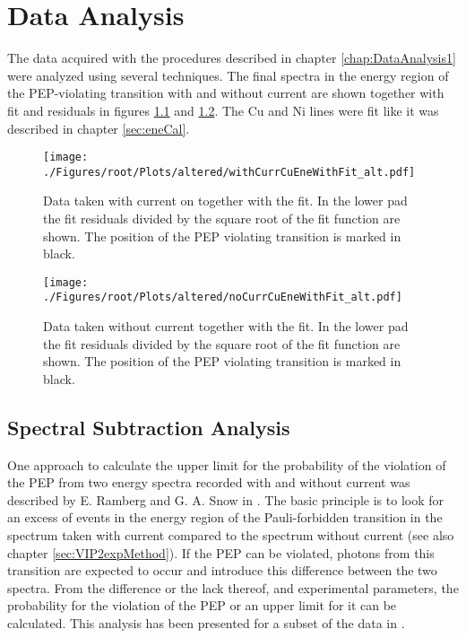\chapter{Data Analysis}
\label{DataAnalysis2}

The data acquired with the procedures described in chapter \ref{chap:DataAnalysis1} were analyzed using several techniques. The final spectra in the energy region of the PEP-violating transition with and without current are shown together with fit and residuals in figures \ref{fig:withCuwithFit} and \ref{fig:noCuwithFit}. The Cu and Ni lines were fit like it was described in chapter \ref{sec:eneCal}. 
\begin{figure}[h]
 \centering
 \texttt{[image: ./Figures/root/Plots/altered/withCurrCuEneWithFit\_alt.pdf]}
 \caption{Data taken with current on together with the fit. In the lower pad the fit residuals divided by the square root of the fit function are shown. The position of the PEP violating transition is marked in black.}
 \label{fig:withCuwithFit}
\end{figure}
%
\begin{figure}[h]
 \centering
 \texttt{[image: ./Figures/root/Plots/altered/noCurrCuEneWithFit\_alt.pdf]}
 \caption{Data taken without current together with the fit. In the lower pad the fit residuals divided by the square root of the fit function are shown. The position of the PEP violating transition is marked in black.}
 \label{fig:noCuwithFit}
\end{figure}



\section{Spectral Subtraction Analysis}
\label{sec:rsanalysis}

One approach to calculate the upper limit for the probability of the violation of the PEP from two energy spectra recorded with and without current was described by E. Ramberg and G. A. Snow in \cite{RAMBERG1990}. The basic principle is to look for an excess of events in the energy region of the Pauli-forbidden transition in the spectrum taken with current compared to the spectrum without current (see also chapter \ref{sec:VIP2expMethod}). If the PEP can be violated, photons from this transition are expected to occur and introduce this difference between the two spectra. From the difference or the lack thereof, and experimental parameters, the probability for the violation of the PEP or an upper limit for it can be calculated. This analysis has been presented for a subset of the data in \cite{Curceanu2017a}.

